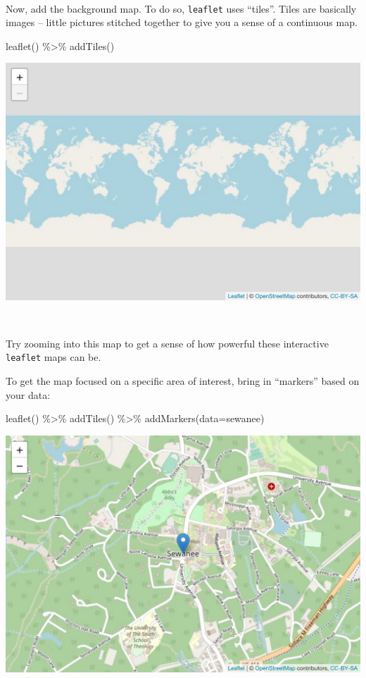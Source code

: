\documentclass[
]{book}
\newenvironment{Shaded}{\begin{snugshade}}{\end{snugshade}}
\newcommand{\AttributeTok}[1]{\textcolor[rgb]{0.77,0.63,0.00}{#1}}
\newcommand{\FunctionTok}[1]{\textcolor[rgb]{0.00,0.00,0.00}{#1}}
\newcommand{\NormalTok}[1]{#1}
\newcommand{\SpecialCharTok}[1]{\textcolor[rgb]{0.00,0.00,0.00}{#1}}
\begin{document}
~

Now, add the background map. To do so, \texttt{leaflet} uses ``tiles''. Tiles are basically images -- little pictures stitched together to give you a sense of a continuous map.

\begin{Shaded}
\begin{Highlighting}[]
\FunctionTok{leaflet}\NormalTok{() }\SpecialCharTok{\%\textgreater{}\%} \FunctionTok{addTiles}\NormalTok{() }
\end{Highlighting}
\end{Shaded}

\includegraphics[width=694.08px]{figures/unnamed-chunk-222-1}

~

Try zooming into this map to get a sense of how powerful these interactive \texttt{leaflet} maps can be.

To get the map focused on a specific area of interest, bring in ``markers'' based on your data:

\begin{Shaded}
\begin{Highlighting}[]
\FunctionTok{leaflet}\NormalTok{() }\SpecialCharTok{\%\textgreater{}\%} 
    \FunctionTok{addTiles}\NormalTok{() }\SpecialCharTok{\%\textgreater{}\%} 
    \FunctionTok{addMarkers}\NormalTok{(}\AttributeTok{data=}\NormalTok{sewanee)}
\end{Highlighting}
\end{Shaded}

\includegraphics[width=694.08px]{figures/unnamed-chunk-223-1}
\end{document}
